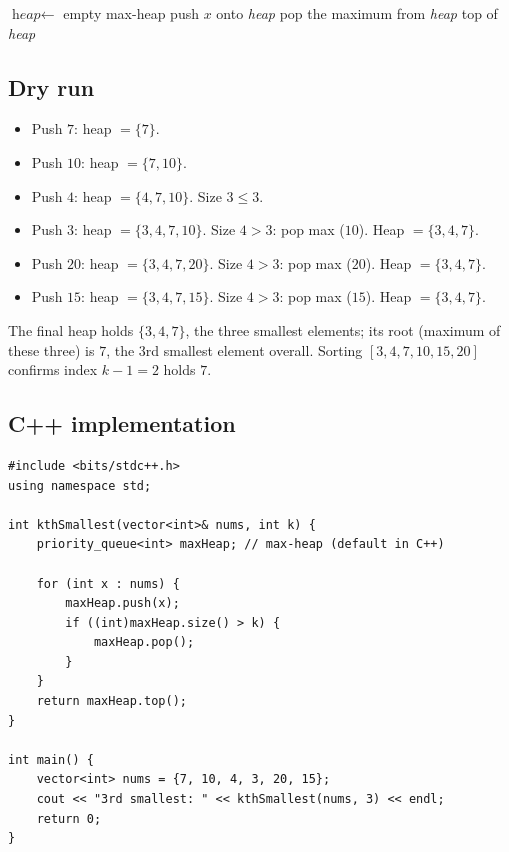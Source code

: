 \begin{algorithm}[H]
\caption{Kth Smallest Element}
\begin{algorithmic}[1]
  \State $\textit{heap} \gets$ empty max-heap
    \State push $x$ onto \textit{heap}
      \State pop the maximum from \textit{heap}
    \EndIf
  \EndFor
  \State \Return top of \textit{heap}
\EndProcedure
\end{algorithmic}
\end{algorithm}

\subsection*{Dry run}


\begin{itemize}
  \item Push $7$: heap $=\{7\}$.
  \item Push $10$: heap $=\{7,10\}$.
  \item Push $4$: heap $=\{4,7,10\}$. Size $3 \le 3$.
  \item Push $3$: heap $=\{3,4,7,10\}$. Size $4>3$: pop max ($10$). Heap
        $=\{3,4,7\}$.
  \item Push $20$: heap $=\{3,4,7,20\}$. Size $4>3$: pop max ($20$). Heap
        $=\{3,4,7\}$.
  \item Push $15$: heap $=\{3,4,7,15\}$. Size $4>3$: pop max ($15$). Heap
        $=\{3,4,7\}$.
\end{itemize}

The final heap holds $\{3,4,7\}$, the three smallest elements; its root
(maximum of these three) is $7$, the $3$rd smallest element overall.
Sorting $[3,4,7,10,15,20]$ confirms index $k-1=2$ holds $7$.

\subsection*{C++ implementation}

\begin{lstlisting}
#include <bits/stdc++.h>
using namespace std;

int kthSmallest(vector<int>& nums, int k) {
    priority_queue<int> maxHeap; // max-heap (default in C++)

    for (int x : nums) {
        maxHeap.push(x);
        if ((int)maxHeap.size() > k) {
            maxHeap.pop();
        }
    }
    return maxHeap.top();
}

int main() {
    vector<int> nums = {7, 10, 4, 3, 20, 15};
    cout << "3rd smallest: " << kthSmallest(nums, 3) << endl;
    return 0;
}
\end{lstlisting}

